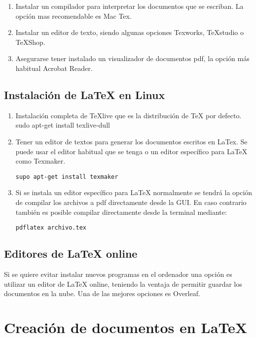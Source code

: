 \documentclass[11pt, a4paper]{article}
\begin{document}
\begin{enumerate}[1.]
\item Instalar un compilador para interpretar los documentos que se escriban. La opción mas recomendable es Mac Tex.

\item Instalar un editor de texto, siendo algunas opciones Texworks, TeXstudio o TeXShop.

\item Asegurarse tener instalado un visualizador de documentos pdf, la opción más habitual Acrobat Reader.
\end{enumerate}

\subsection{Instalación de LaTeX en Linux}

\begin{enumerate}[1.]
\item Instalación completa de TeXlive que es la distribución de TeX por defecto. 
sudo apt-get install texlive-dull

\item Tener un editor de textos para generar los documentos escritos en LaTex. Se puede usar el editor habitual que se tenga o un editor específico para LaTeX como Texmaker.

	\texttt{supo apt-get install texmaker}
	
\item Si se instala un editor específico para LaTeX normalmente se tendrá la opción de compilar los archivos a pdf directamente desde la GUI. En caso contrario también es posible compilar directamente desde la terminal mediante:

	\texttt{pdflatex archivo.tex}
\end{enumerate}

\subsection{Editores de LaTeX online}

Si se quiere evitar instalar nuevos programas en el ordenador una opción es utilizar un editor de LaTeX online, teniendo la ventaja de permitir guardar los documentos en la nube. Una de las mejores opciones es Overleaf.

\section{Creación de documentos en LaTeX}
\end{document}
